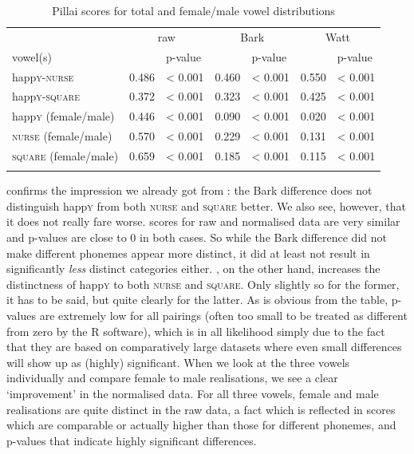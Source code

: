 \begin{table}
	
	\caption{Pillai scores for total and female/male vowel distributions}
	\begin{tabular}{lllllll}
		\lsptoprule
		& \multicolumn{2}{c}{raw} & \multicolumn{2}{c}{Bark} & \multicolumn{2}{c}{Watt}\\
		vowel(s) & \isi{Pillai} & p-value & \isi{Pillai} & p-value & \isi{Pillai} & p-value\\
		\midrule
		happ\textsc{y}-\textsc{nurse} &
		0.486 &
		< 0.001 &
		0.460 &
		< 0.001 &
		0.550 &
		< 0.001\\
		happ\textsc{y}-\textsc{square} &
		0.372 &
		< 0.001 &
		0.323 &
		< 0.001 &
		0.425 &
		< 0.001 \\
		happ\textsc{y} (female/male) &
		0.446 &
		< 0.001 &
		0.090 &
		< 0.001 &
		0.020 &
		< 0.001 \\
		\textsc{nurse} (female/male) &
		0.570 &
		< 0.001 &
		0.229 &
		< 0.001 &
		0.131 &
		< 0.001 \\
		\textsc{square} (female/male) &
		0.659 &
		< 0.001 &
		0.185 &
		< 0.001 &
		0.115 &
		< 0.001 \\
		\lspbottomrule
	\end{tabular}
	\label{tab.pillai}
\end{table}

 confirms the impression we already got from : the Bark difference  does not distinguish happ\textsc{y} from both \textsc{nurse} and \textsc{square} better.
We also see, however, that it does not really fare worse.
 scores for raw and normalised data are very similar and p-values are close to 0 in both cases.
So while the Bark difference  did not make different phonemes appear more distinct, it did at least not result in significantly \emph{less} distinct categories either.
\citeauthor{wattfabricius2002}, on the other hand, increases the distinctness of happ\textsc{y} to both \textsc{nurse} and \textsc{square}.
Only slightly so for the former, it has to be said, but quite clearly for the latter.
As is obvious from the table, p-values are extremely low for all pairings (often too small to be treated as different from zero by the R software), which is in all likelihood simply due to the fact that they are based on comparatively large datasets where even small differences will show up as (highly) significant.
When we look at the three vowels individually and compare female to male realisations, we see a clear `improvement' in the normalised data.
For all three vowels, female and male realisations are quite distinct in the raw data, a fact which is reflected in  scores which are comparable or actually higher than those for different phonemes, and p-values that indicate highly significant differences. 

